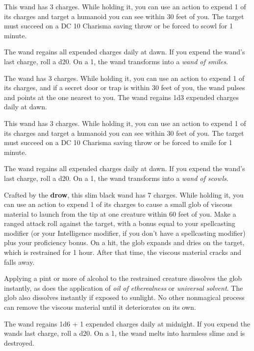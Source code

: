 \documentclass[10pt,a4paper,twoside,bg=print,twocolumn,openany,nodeprecatedcode]{dndbook}
\begin{document}
This wand has 3 charges. While holding it, you can use an action to expend 1 of its charges and target a humanoid you can see within 30 feet of you. The target must succeed on a DC 10 Charisma saving throw or be forced to scowl for 1 minute.

The wand regains all expended charges daily at dawn. If you expend the wand's last charge, roll a d20. On a 1, the wand transforms into a \textit{wand of smiles}.

The wand has 3 charges. While holding it, you can use an action to expend 1 of its charges, and if a secret door or trap is within 30 feet of you, the wand pulses and points at the one nearest to you. The wand regains 1d3 expended charges daily at dawn.

This wand has 3 charges. While holding it, you can use an action to expend 1 of its charges and target a humanoid you can see within 30 feet of you. The target must succeed on a DC 10 Charisma saving throw or be forced to smile for 1 minute.

The wand regains all expended charges daily at dawn. If you expend the wand's last charge, roll a d20. On a 1, the wand transforms into a \textit{wand of scowls}.

Crafted by the \textbf{drow}, this slim black wand has 7 charges. While holding it, you can use an action to expend 1 of its charges to cause a small glob of viscous material to launch from the tip at one creature within 60 feet of you. Make a ranged attack roll against the target, with a bonus equal to your spellcasting modifier (or your Intelligence modifier, if you don't have a spellcasting modifier) plus your proficiency bonus. On a hit, the glob expands and dries on the target, which is restrained for 1 hour. After that time, the viscous material cracks and falls away.

Applying a pint or more of alcohol to the restrained creature dissolves the glob instantly, as does the application of \textit{oil of etherealness} or \textit{universal solvent}. The glob also dissolves instantly if exposed to sunlight. No other nonmagical process can remove the viscous material until it deteriorates on its own.

The wand regains 1d6 + 1 expended charges daily at midnight. If you expend the wands last charge, roll a d20. On a 1, the wand melts into harmless slime and is destroyed.
\end{document}
